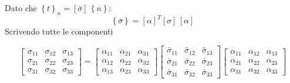 Dato che $\left\{ t\right\}_n=\left[\bar{\sigma}\right]\,\left\{n\right\}$:
\begin{equation*}
    \left\{ \bar{\sigma}\right\}=\left[\alpha\right]^T\left[\sigma\right]\,\left[\alpha\right]
\end{equation*}
Scrivendo tutte le componenti
    
\begin{equation*}
    \begin{bmatrix}
        \sigma_{11} & \sigma_{12} & \sigma_{13} \\
        \sigma_{21} & \sigma_{22} & \sigma_{23} \\
        \sigma_{31} & \sigma_{32} & \sigma_{33}
    \end{bmatrix}
    =
    \begin{bmatrix}
        \alpha_{11} & \alpha_{21} & \alpha_{31} \\
        \alpha_{12} & \alpha_{22} & \alpha_{32} \\
        \alpha_{13} & \alpha_{23} & \alpha_{33}
    \end{bmatrix}
     \begin{bmatrix}
        \bar{\sigma}_{11} & \bar{\sigma}_{12} & \bar{\sigma}_{13} \\
        \bar{\sigma}_{21} & \bar{\sigma}_{22} & \bar{\sigma}_{23} \\
        \bar{\sigma}_{31} & \bar{\sigma}_{32} & \bar{\sigma}_{33}
    \end{bmatrix}
    \begin{bmatrix}
        \alpha_{11} & \alpha_{12} & \alpha_{13} \\
        \alpha_{21} & \alpha_{22} & \alpha_{23} \\
        \alpha_{31} & \alpha_{32} & \alpha_{33}
    \end{bmatrix}
\end{equation*}


